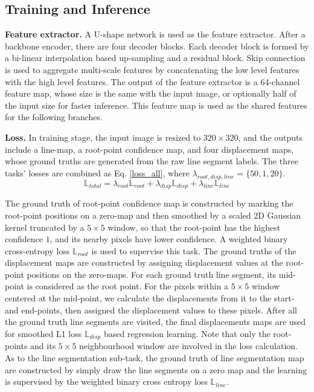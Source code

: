 \documentclass[runningheads]{llncs}
\begin{document}
\subsection{Training and Inference}\label{infer}

\textbf{Feature extractor.}
A U-shape network is used as the feature extractor. After a backbone encoder, there are four decoder blocks. Each decoder block is formed by a bi-linear interpolation based up-sampling and a residual block. Skip connection is used to aggregate multi-scale features by concatenating the low level features with the high level features. The output of the feature extractor is a 64-channel feature map, whose size is the same with the input image, or optionally half of the input size for faster inference. This feature map is used as the shared features for the following branches.

\textbf{Loss.}
In training stage, the input image is resized to $320 \times 320$, and the outputs include a line-map, a root-point confidence map, and four displacement maps, whose ground truths are generated from the raw line segment labels. The three tasks' losses are combined as Eq. \eqref{loss_all}, where $\lambda_{root, disp, line}=\{50, 1, 20\}$. \begin{equation}
\mathbb{L}_{total} = \lambda_{root}\mathbb{L}_{root} + \lambda_{disp}\mathbb{L}_{disp} + \lambda_{line}\mathbb{L}_{line}
\label{loss_all}
\end{equation}


The ground truth of root-point confidence map is constructed by marking the root-point positions on a zero-map and then smoothed by a scaled 2D Gaussian kernel truncated by a $5 \times 5$ window, so that the root-point has the highest confidence $1$, and its nearby pixels have lower confidence. A weighted binary cross-entropy loss $\mathbb{L}_{root}$ is used to supervise this task. The ground truths of the displacement maps are constructed by assigning displacement values at the root-point positions on the zero-maps. For each ground truth line segment, its mid-point is considered as the root point. For the pixels within a $5 \times 5$ window centered at the mid-point, we calculate the displacements from it to the start- and end-points, then assigned the displacement values to these pixels. After all the ground truth line segments are visited, the final displacements maps are used for smoothed L1 loss $\mathbb{L}_{disp}$ based regression learning. Note that only the root-points and its $5 \times 5$ neighbourhood window are involved in the loss calculation. As to the line segmentation sub-task, the ground truth of line segmentation map are constructed by simply draw the line segments on a zero map and the learning is supervised by the weighted binary cross entropy loss $\mathbb{L}_{line}$.
\end{document}
